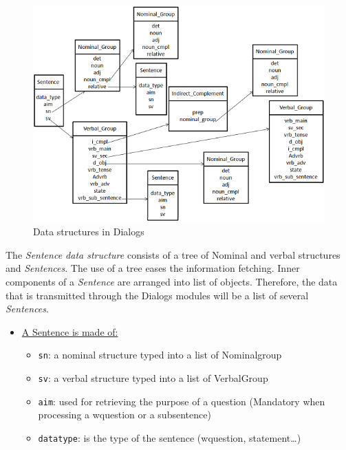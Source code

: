 \documentclass[twoside,a4paper,10pt]{report}
\begin{document}
\begin{figure}[h]
\centering
\includegraphics[width=\linewidth]{data_structs.png}
\caption{Data structures in Dialogs}
\end{figure}


The \textsl{Sentence data structure} consists of a tree of Nominal and verbal structures and \textsl{Sentences}. The use of a tree eases the information fetching.
Inner components of a \textsl{Sentence} are arranged into list of objects. Therefore, the data that is transmitted through the Dialogs modules will be a list of several \textsl{Sentences}.


\begin{itemize}
    \item  \underline{A Sentence is made of:}
\begin{itemize}
    \item  \texttt{sn}: a nominal structure typed into a list of Nominal{\textunderscore}group
    \item  \texttt{sv}: a verbal structure typed into a list of Verbal{\textunderscore}Group
    \item  \texttt{aim}: used for retrieving the purpose of a question (Mandatory when processing a w{\textunderscore}question or a subsentence)
    \item  \texttt{data{\textunderscore}type}: is the type of the sentence (w{\textunderscore}question, statement\ldots{})
\end{itemize}

\end{itemize}
\end{document}
